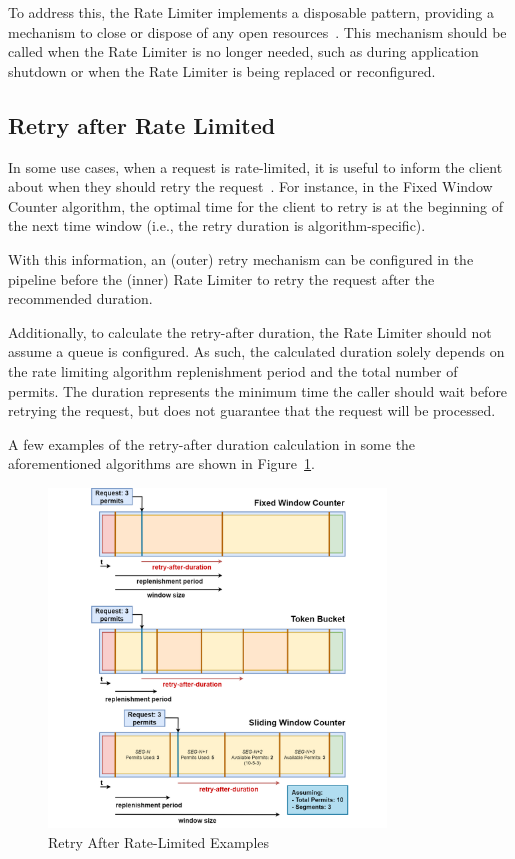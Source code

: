To address this, the Rate Limiter implements a disposable pattern,
providing a mechanism to close or dispose of any open resources~\cite{microsoft-dispose-pattern}.
This mechanism should be called when the Rate Limiter is no longer needed, such as during application shutdown or when the Rate Limiter is being replaced or reconfigured.

\subsection{Retry after Rate Limited}\label{subsec:rate-limiter-retry-after}

In some use cases, when a request is rate-limited, it is useful to inform the client about when they should retry the request~\cite{mdn-retry-after}.
For instance, in the Fixed Window Counter algorithm,
the optimal time for the client to retry is at the beginning of the next time window
(i.e., the retry duration is algorithm-specific).

With this information,
an (outer) retry mechanism can be configured in the pipeline before the
(inner) Rate Limiter to retry the request after the recommended duration.

Additionally, to calculate the retry-after duration, the Rate Limiter should not assume a queue is configured.
As such,
the calculated duration solely depends on the rate limiting algorithm replenishment period and the total number of permits.
The duration represents the minimum time the caller should wait before retrying the request, but does not guarantee that the request will be processed.

A few examples of the retry-after duration calculation in some the aforementioned algorithms are shown in Figure~\ref{fig:rate-limiter-retry-after}.

\begin{figure}[!htb]
    \centering
    \includegraphics[width=0.8\textwidth]{../figures/06_retry-after-rate-limited}
    \caption{Retry After Rate-Limited Examples}
    \label{fig:rate-limiter-retry-after}
\end{figure}

